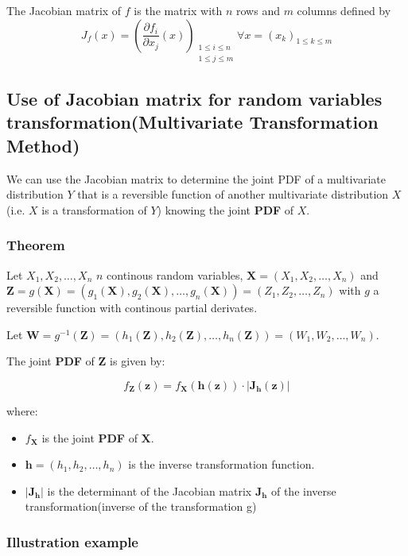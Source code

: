 \documentclass[11pt]{article}
\begin{document}
The Jacobian matrix of \( f \) is the matrix with \( n \) rows and \( m \) columns defined by
\[ J_f(x) = \left(\frac{\partial f_i}{\partial x_j}(x) \right)_{\substack{1 \leq i \leq n \\ 1 \leq j \leq m}} \forall x=(x_k)_{1 \leq k \leq m} \]    

\subsection{Use of Jacobian matrix for random variables transformation(Multivariate Transformation Method)}

We can use the Jacobian matrix to determine the joint PDF of a multivariate distribution $Y$ that is a reversible function of another multivariate distribution $X$ (i.e. $X$ is a transformation of $Y$) knowing the joint \textbf{PDF}  of $X$.

 \subsubsection{Theorem}
Let $X_1, X_2, \ldots, X_n$ $n$ continous random variables, $\mathbf{X} = (X_1, X_2, \ldots, X_n)$ and $\mathbf{Z} = g(\mathbf{X}) = (g_1(\mathbf{X}), g_2(\mathbf{X}), \ldots, g_n(\mathbf{X}))= (Z_1, Z_2, \ldots, Z_n)$ with $g$ a reversible function with continous partial derivates. 

Let $\mathbf{W} = g^{-1}(\mathbf{Z}) = (h_1(\mathbf{Z}), h_2(\mathbf{Z}), \ldots, h_n(\mathbf{Z}))= (W_1, W_2, \ldots, W_n)$.

The joint \textbf{PDF} of $\mathbf{Z}$ is given by:

\[
f_{\mathbf{Z}}(\mathbf{z}) = f_{\mathbf{X}}(\mathbf{h}(\mathbf{z})) \cdot |\mathbf{J_h(z)}|
\]

where:
\begin{itemize}
  \item $f_{\mathbf{X}}$ is the joint \textbf{PDF} of $\mathbf{X}$.
  \item $\mathbf{h} = (h_1, h_2, \ldots, h_n)$ is the inverse transformation function.
  \item $|\mathbf{J_h}|$ is the determinant of the Jacobian matrix $\mathbf{J_h}$ of the inverse transformation(inverse of the transformation g)
\end{itemize}

\subsubsection{Illustration example}
\end{document}

